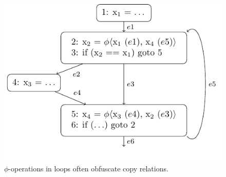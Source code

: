 \begin{figure}[t!]
  \begin{center}
    \includegraphics{copy_propagation_loop}
  \end{center}
  \vspace{-1em}
  \caption{$\phi$-operations in loops often obfuscate copy relations.}
  \label{novillo:fig:copy_propagation_loop}
\end{figure}

